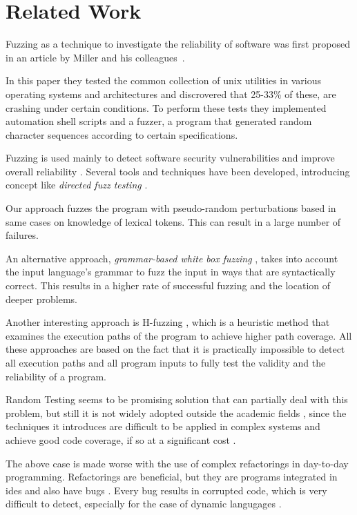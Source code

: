 \documentclass[10pt]{sigplanconf}
\begin{document}
\section{Related Work} %
\label{sec:related}

Fuzzing as a technique to investigate the reliability of software
was first proposed in an article by Miller and his colleagues~\cite{MFS90}.

In this paper they tested the common collection of {\sc unix}
utilities in various operating systems and architectures and discrovered that
25-33\% of these, are crashing under certain conditions. To perform these tests
they implemented automation shell scripts and a fuzzer, a program that generated
random character sequences according to certain specifications.

Fuzzing is used mainly to detect software security vulnerabilities and 
improve overall reliability \cite{TJC08,GODE07}. Several tools and techniques \cite{WWGZ11}
have been developed, introducing concept like \textit{directed fuzz testing} \cite{GLRI09}.

Our approach fuzzes the program with pseudo-random
perturbations based in same cases on knowledge of
lexical tokens. This can result in a large number of failures.

An alternative approach, {\em grammar-based white box fuzzing} \cite{God08},
takes into account the input language's grammar to fuzz the input in
ways that are syntactically correct.
This results in a higher rate of successful fuzzing and the location
of deeper problems.

Another interesting approach is H-fuzzing \cite{ZWZH11}, which is a heuristic method that examines the execution paths
of the program to achieve higher path coverage. All these approaches are based on the fact that it is practically impossible to detect all
execution paths and all program inputs to fully test the validity and the reliability of a program.

Random Testing \cite{HAM06} seems to be promising solution that can partially deal with this problem,
but still it is not widely adopted outside the academic fields \cite{GGBO07}, since the techniques it 
introduces are difficult to be applied in complex systems and achieve good code coverage, if so at a significant cost \cite{RAWO06}.

The above case is made worse with the use of complex refactorings \cite{Fow00} in day-to-day programming. Refactorings are beneficial, but they are programs integrated in {\sc ide}s and also have bugs \cite{DDGM07}. Every bug results in corrupted code, which is very difficult to detect, especially for the case of dynamic langugages \cite{SCHA12,FFM11}.
\end{document}
